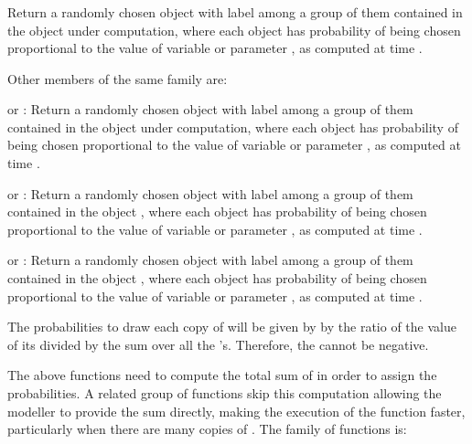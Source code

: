 \documentclass [11pt,a4paper] {book}
\begin{document}
\subsubsection{ }
Return a randomly chosen object with label  among a group of them contained in the
object under computation, where each object has probability of being chosen proportional
to the value of variable or parameter , as computed at time .

Other members of the same family are:

\begin{list}{-}{\itemsep -0.2cm}
\item {} or : Return a randomly chosen object with label  among a group of them contained in the object under computation, where each object has probability of being chosen proportional to the value of variable or parameter , as computed at time .

\item {} or : Return a randomly chosen object with label  among a group of them contained in the object , where each object has probability of being chosen proportional to the value of variable or parameter , as computed at time .

\item {} or : Return a randomly chosen object with label  among a group of them contained in the object , where each object has probability of being chosen proportional to the value of variable or parameter , as computed at time .

\end{list}

The probabilities to draw each copy of  will be given by by the ratio of the value of its  divided by the sum over all the 's. Therefore, the  cannot be negative.

The above functions need to compute the total sum of  in order to assign the
probabilities. A related group of functions skip this computation allowing the modeller
to provide the sum directly, making the execution of the function faster, particularly when there are many copies of . The family of functions is:
\end{document}
